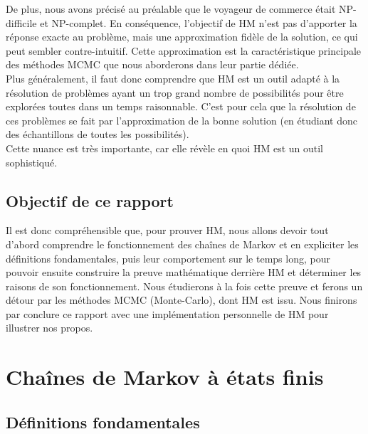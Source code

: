\documentclass{article}
\begin{document}
De plus, nous avons précisé au préalable que le voyageur de commerce était NP-difficile et NP-complet. En conséquence, l'objectif de HM n'est pas d'apporter la réponse exacte au problème, mais une approximation fidèle de la solution, ce qui peut sembler contre-intuitif. Cette approximation est la caractéristique principale des méthodes MCMC que nous aborderons dans leur partie dédiée. \\
Plus généralement, il faut donc comprendre que HM est un outil adapté à la résolution de problèmes ayant un trop grand nombre de possibilités pour être explorées toutes dans un temps raisonnable. C'est pour cela que la résolution de ces problèmes se fait par l'approximation de la bonne solution (en étudiant donc des échantillons de toutes les possibilités). \\
Cette nuance est très importante, car elle révèle en quoi HM est un outil sophistiqué. \\ 

\subsection{Objectif de ce rapport}

Il est donc compréhensible que, pour prouver HM, nous allons devoir tout d'abord comprendre le fonctionnement des chaînes de Markov et en expliciter les définitions fondamentales, puis leur comportement sur le temps long, pour pouvoir ensuite construire la preuve mathématique derrière HM et déterminer les raisons de son fonctionnement. Nous étudierons à la fois cette preuve et ferons un détour par les méthodes MCMC (Monte-Carlo), dont HM est issu. Nous finirons par conclure ce rapport avec une implémentation personnelle de HM pour illustrer nos propos.



\newpage %
\section{Chaînes de Markov à états finis}

\subsection{Définitions fondamentales}

\end{document}
